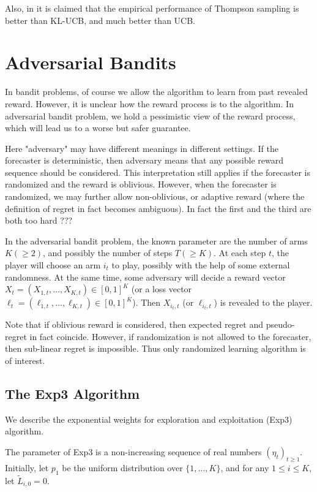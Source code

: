 \documentclass[openany]{book}
\theoremstyle{definition}
\theoremstyle{remark}
\begin{document}
Also, in \cite{KKM12} it is claimed that the empirical performance of Thompson sampling is better than KL-UCB, and much better than UCB.

\chapter{Adversarial Bandits}
In bandit problems, of course we allow the algorithm to learn from past revealed reward. However, it is unclear how the reward process is to the algorithm. In adversarial bandit problem, we hold a pessimistic view of the reward process, which will lead us to a worse but safer guarantee.

Here "adversary" may have different meanings in different settings. If the forecaster is deterministic, then adversary means that any possible reward sequence should be considered. This interpretation still applies if the forecaster is randomized and the reward is oblivious. However, when the forecaster is randomized, we may further allow non-oblivious, or adaptive reward (where the definition of regret in fact becomes ambiguous). In fact the first and the third are both too hard ???

In the adversarial bandit problem, the known parameter are the number of arms $K(\ge2)$, and possibly the number of steps $T(\ge K)$. At each step $t$, the player will choose an arm $i_t$ to play, possibly with the help of some external randomness. At the same time, some adversary will decide a reward vector $X_t=(X_{1,t},\ldots,X_{K,t})\in[0,1]^K$ (or a loss vector $\ell_t=(\ell_{1,t},\ldots,\ell_{K,t})\in[0,1]^K$). Then $X_{i_t,t}$ (or $\ell_{i_t,t}$) is revealed to the player.

Note that if oblivious reward is considered, then expected regret and pseudo-regret in fact coincide. However, if randomization is not allowed to the forecaster, then sub-linear regret is impossible. Thus only randomized learning algorithm is of interest.

\section{The Exp3 Algorithm}
We describe the exponential weights for exploration and exploitation (Exp3) algorithm.

The parameter of Exp3 is a non-increasing sequence of real numbers $(\eta_t)_{t\ge1}$. Initially, let $p_1$ be the uniform distribution over $\{1,\ldots,K\}$, and for any $1\le i\le K$, let $\widetilde{L}_{i,0}=0$.
\end{document}

